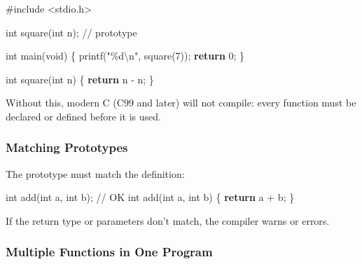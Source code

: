 \documentclass[
  letterpaper,
  DIV=11,
  numbers=noendperiod]{scrreprt}
\newenvironment{Shaded}{\begin{snugshade}}{\end{snugshade}}
\newcommand{\CommentTok}[1]{\textcolor[rgb]{0.37,0.37,0.37}{#1}}
\newcommand{\ControlFlowTok}[1]{\textcolor[rgb]{0.00,0.23,0.31}{\textbf{#1}}}
\newcommand{\DataTypeTok}[1]{\textcolor[rgb]{0.68,0.00,0.00}{#1}}
\newcommand{\DecValTok}[1]{\textcolor[rgb]{0.68,0.00,0.00}{#1}}
\newcommand{\ImportTok}[1]{\textcolor[rgb]{0.00,0.46,0.62}{#1}}
\newcommand{\NormalTok}[1]{\textcolor[rgb]{0.00,0.23,0.31}{#1}}
\newcommand{\OperatorTok}[1]{\textcolor[rgb]{0.37,0.37,0.37}{#1}}
\newcommand{\PreprocessorTok}[1]{\textcolor[rgb]{0.68,0.00,0.00}{#1}}
\newcommand{\SpecialCharTok}[1]{\textcolor[rgb]{0.37,0.37,0.37}{#1}}
\newcommand{\StringTok}[1]{\textcolor[rgb]{0.13,0.47,0.30}{#1}}
\begin{document}
\begin{Shaded}
\begin{Highlighting}[]
\PreprocessorTok{\#include }\ImportTok{\textless{}stdio.h\textgreater{}}

\DataTypeTok{int}\NormalTok{ square}\OperatorTok{(}\DataTypeTok{int}\NormalTok{ n}\OperatorTok{);}  \CommentTok{// prototype}

\DataTypeTok{int}\NormalTok{ main}\OperatorTok{(}\DataTypeTok{void}\OperatorTok{)} \OperatorTok{\{}
\NormalTok{    printf}\OperatorTok{(}\StringTok{"}\SpecialCharTok{\%d\textbackslash{}n}\StringTok{"}\OperatorTok{,}\NormalTok{ square}\OperatorTok{(}\DecValTok{7}\OperatorTok{));}
    \ControlFlowTok{return} \DecValTok{0}\OperatorTok{;}
\OperatorTok{\}}

\DataTypeTok{int}\NormalTok{ square}\OperatorTok{(}\DataTypeTok{int}\NormalTok{ n}\OperatorTok{)} \OperatorTok{\{}
    \ControlFlowTok{return}\NormalTok{ n }\OperatorTok{{-}}\NormalTok{ n}\OperatorTok{;}
\OperatorTok{\}}
\end{Highlighting}
\end{Shaded}

Without this, modern C (C99 and later) will not compile: every function
must be declared or defined before it is used.

\subsubsection{Matching Prototypes}\label{matching-prototypes}

The prototype must match the definition:

\begin{Shaded}
\begin{Highlighting}[]
\DataTypeTok{int}\NormalTok{ add}\OperatorTok{(}\DataTypeTok{int}\NormalTok{ a}\OperatorTok{,} \DataTypeTok{int}\NormalTok{ b}\OperatorTok{);}          \CommentTok{// OK}
\DataTypeTok{int}\NormalTok{ add}\OperatorTok{(}\DataTypeTok{int}\NormalTok{ a}\OperatorTok{,} \DataTypeTok{int}\NormalTok{ b}\OperatorTok{)} \OperatorTok{\{} \ControlFlowTok{return}\NormalTok{ a }\OperatorTok{+}\NormalTok{ b}\OperatorTok{;} \OperatorTok{\}}
\end{Highlighting}
\end{Shaded}

If the return type or parameters don't match, the compiler warns or
errors.

\subsubsection{Multiple Functions in One
Program}\label{multiple-functions-in-one-program}
\end{document}
